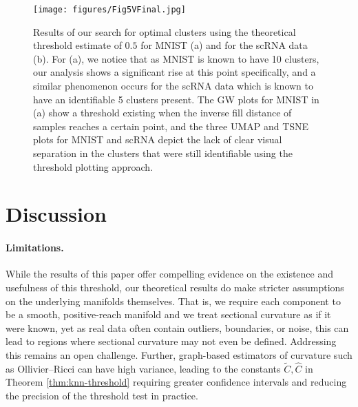 \documentclass{article}
\theoremstyle{plain}
\theoremstyle{definition}
\theoremstyle{remark}
\begin{document}
\begin{figure}[t]
\centering
\texttt{[image: figures/Fig5VFinal.jpg]}
\caption{Results of our search for optimal clusters using the theoretical threshold estimate of $0.5$ for MNIST (a) and for the scRNA data (b). For (a), we notice that as MNIST is known to have 10 clusters, our analysis shows a significant rise at this point specifically, and a similar phenomenon occurs for the scRNA data which is known to have an identifiable 5 clusters present. The GW plots for MNIST in (a) show a threshold existing when the inverse fill distance of samples reaches a certain point, and the three UMAP and TSNE plots for MNIST and scRNA depict the lack of clear visual separation in the clusters that were still identifiable using the threshold plotting approach.}
\label{fig:MNIST}
\end{figure}


\section{Discussion}
\label{sec:discussion}

\paragraph{Limitations.}
While the results of this paper offer compelling evidence on the existence and usefulness of this threshold, our theoretical results do make stricter assumptions on the underlying manifolds themselves. That is, we require each component to be a smooth, positive-reach manifold and we treat sectional curvature as if it were known, yet as real data often contain outliers, boundaries, or noise, this can lead to regions where sectional curvature may not even be defined. Addressing this remains an open challenge. 
Further, graph-based estimators of curvature such as Ollivier–Ricci can have high variance, leading to the constants \(\widetilde{C},\widehat{C}\) in Theorem \ref{thm:knn-threshold} requiring greater confidence intervals and reducing the precision of the threshold test in practice. \citet{saidiRecoveringManifoldStructure2024}
\end{document}
